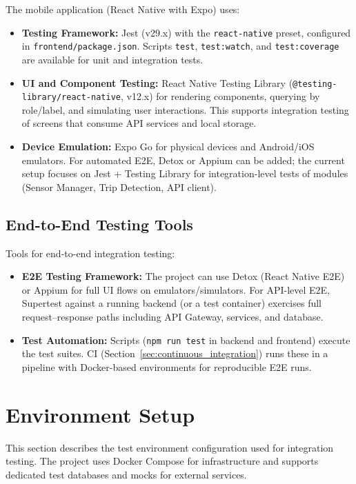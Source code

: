 The mobile application (React Native with Expo) uses:
\begin{itemize}
    \item \textbf{Testing Framework:} Jest (v29.x) with the \texttt{react-native} preset, configured in \texttt{frontend/package.json}. Scripts \texttt{test}, \texttt{test:watch}, and \texttt{test:coverage} are available for unit and integration tests.
    \item \textbf{UI and Component Testing:} React Native Testing Library (\texttt{@testing-library/react-native}, v12.x) for rendering components, querying by role/label, and simulating user interactions. This supports integration testing of screens that consume API services and local storage.
    \item \textbf{Device Emulation:} Expo Go for physical devices and Android/iOS emulators. For automated E2E, Detox or Appium can be added; the current setup focuses on Jest + Testing Library for integration-level tests of modules (Sensor Manager, Trip Detection, API client).
\end{itemize}

\subsection{End-to-End Testing Tools}
\label{subsec:e2e_testing_tools}%

Tools for end-to-end integration testing:
\begin{itemize}
    \item \textbf{E2E Testing Framework:} The project can use Detox (React Native E2E) or Appium for full UI flows on emulators/simulators. For API-level E2E, Supertest against a running backend (or a test container) exercises full request--response paths including API Gateway, services, and database.
    \item \textbf{Test Automation:} Scripts (\texttt{npm run test} in backend and frontend) execute the test suites. CI (Section~\ref{sec:continuous_integration}) runs these in a pipeline with Docker-based environments for reproducible E2E runs.
\end{itemize}

\section{Environment Setup}
\label{sec:environment_setup}%

This section describes the test environment configuration used for integration testing. The project uses Docker Compose for infrastructure and supports dedicated test databases and mocks for external services.

